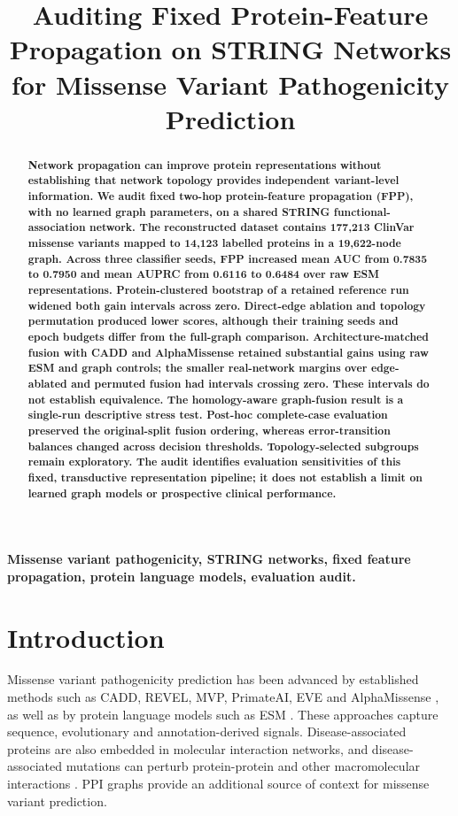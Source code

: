 \documentclass[conference]{IEEEtran}
\title{Auditing Fixed Protein-Feature Propagation on STRING Networks for Missense Variant Pathogenicity Prediction}
\author{}
\begin{document}
\maketitle


\begin{abstract}
\bfseries\boldmath
Network propagation can improve protein representations without establishing that network topology provides independent variant-level information. We audit fixed two-hop protein-feature propagation (FPP), with no learned graph parameters, on a shared STRING functional-association network. The reconstructed dataset contains 177,213 ClinVar missense variants mapped to 14,123 labelled proteins in a 19,622-node graph. Across three classifier seeds, FPP increased mean AUC from 0.7835 to 0.7950 and mean AUPRC from 0.6116 to 0.6484 over raw ESM representations. Protein-clustered bootstrap of a retained reference run widened both gain intervals across zero. Direct-edge ablation and topology permutation produced lower scores, although their training seeds and epoch budgets differ from the full-graph comparison. Architecture-matched fusion with CADD and AlphaMissense retained substantial gains using raw ESM and graph controls; the smaller real-network margins over edge-ablated and permuted fusion had intervals crossing zero. These intervals do not establish equivalence. The homology-aware graph-fusion result is a single-run descriptive stress test. Post-hoc complete-case evaluation preserved the original-split fusion ordering, whereas error-transition balances changed across decision thresholds. Topology-selected subgroups remain exploratory. The audit identifies evaluation sensitivities of this fixed, transductive representation pipeline; it does not establish a limit on learned graph models or prospective clinical performance.

\end{abstract}

\begin{IEEEkeywords}
\bfseries\boldmath
Missense variant pathogenicity, STRING networks, fixed feature propagation, protein language models, evaluation audit.
\end{IEEEkeywords}

\section{Introduction}

Missense variant pathogenicity prediction has been advanced by established methods such as CADD, REVEL, MVP, PrimateAI, EVE and AlphaMissense \cite{Kircher2014CADD,Ioannidis2016REVEL,Qi2021MVP,Sundaram2018PrimateAI,Frazer2021EVE,Cheng2023AlphaMissense}, as well as by protein language models such as ESM \cite{Lin2023ESM}. These approaches capture sequence, evolutionary and annotation-derived signals. Disease-associated proteins are also embedded in molecular interaction networks, and disease-associated mutations can perturb protein-protein and other macromolecular interactions \cite{Barabasi2011NetworkMedicine,Menche2015DiseaseModules,Sahni2015InteractionPerturbation,Chen2018InteractomePerturbation}. PPI graphs provide an additional source of context for missense variant prediction.
\end{document}
